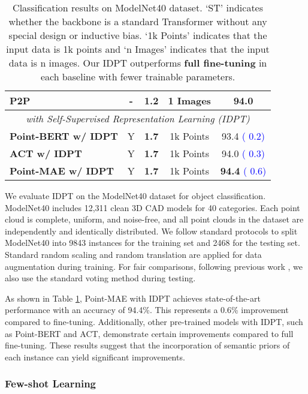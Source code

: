 \documentclass[10pt,twocolumn,letterpaper]{article}
\begin{document}
\begin{table}[htbp]
{\begin{tabular}{lcccc}
    P2P \cite{wang2022p2p}   & -     & 1.2   & 1 Images   & 94.0 \\
    \midrule
    \multicolumn{5}{c}{\textit{with Self-Supervised Representation Learning (IDPT)}} \\
    \midrule
    \rowcolor{mycolor}\textbf{Point-BERT w/ IDPT} & Y     & \textbf{1.7} & 1k Points  & 93.4 \textcolor{blue}{( 0.2)} \\
    \rowcolor{mycolor}\textbf{ACT w/ IDPT} & Y     & \textbf{1.7} & 1k Points  & 94.0 \textcolor{blue}{( 0.3)} \\
    \rowcolor{mycolor}\textbf{Point-MAE w/ IDPT} & Y     & \textbf{1.7} & 1k Points  & \textbf{94.4} \textcolor{blue}{( 0.6)} \\
    \bottomrule
    \end{tabular}}
  \caption{Classification results on ModelNet40 \cite{wu20153d} dataset. ‘ST’ indicates whether the backbone is a standard Transformer \cite{vaswani2017attention} without any special design or inductive bias. ‘1k Points’ indicates that the input data is 1k points and ‘n Images’ indicates that the input data is n images. Our IDPT outperforms \textbf{full fine-tuning} in each baseline with fewer trainable parameters.}
  \label{table2}\end{table}

We evaluate IDPT on the ModelNet40 \cite{wu20153d} dataset for object classification. ModelNet40 \cite{wu20153d} includes 12,311 clean 3D CAD models for 40 categories. Each point cloud is complete, uniform, and noise-free, and all point clouds in the dataset are independently and identically distributed. We follow standard protocols to split ModelNet40 into 9843 instances for the training set and 2468 for the testing set. Standard random scaling and random translation are applied for data augmentation during training. For fair comparisons, following previous work \cite{yu2022point,pang2022masked,dong2022autoencoders}, we also use the standard voting method \cite{liu2019relation} during testing. 

As shown in Table \ref{table2}, Point-MAE with IDPT achieves state-of-the-art performance with an accuracy of 94.4\%. This represents a 0.6\% improvement compared to fine-tuning. Additionally, other pre-trained models with IDPT, such as Point-BERT and ACT, demonstrate certain improvements compared to full fine-tuning. These results suggest that the incorporation of semantic priors of each instance can yield significant improvements.


\subsubsection{Few-shot Learning} 
\end{document}
